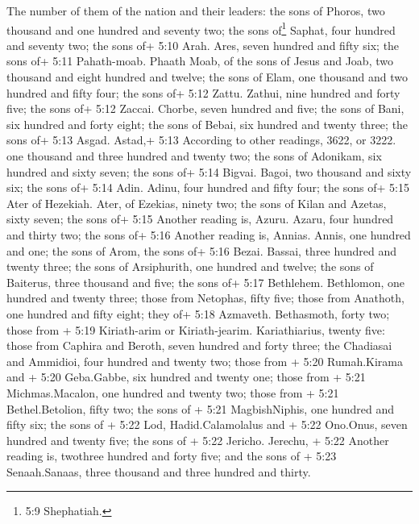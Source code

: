  The number of them of the nation and their leaders: the
sons of Phoros, two thousand and one hundred and seventy two; the sons
of\footnote{5:9 Shephatiah.} Saphat, four hundred and seventy two;
 the sons of+ 5:10 Arah. Ares, seven hundred and fifty six;
 the sons of+ 5:11 Pahath-moab. Phaath Moab, of the sons of
Jesus and Joab, two thousand and eight hundred and twelve; 
the sons of Elam, one thousand and two hundred and fifty four; the sons
of+ 5:12 Zattu. Zathui, nine hundred and forty five; the sons of+ 5:12
Zaccai. Chorbe, seven hundred and five; the sons of Bani, six hundred
and forty eight;  the sons of Bebai, six hundred and twenty
three; the sons of+ 5:13 Asgad. Astad,+ 5:13 According to other
readings, 3622, or 3222. one thousand and three hundred and twenty two;
 the sons of Adonikam, six hundred and sixty seven; the
sons of+ 5:14 Bigvai. Bagoi, two thousand and sixty six; the sons of+
5:14 Adin. Adinu, four hundred and fifty four;  the sons
of+ 5:15 Ater of Hezekiah. Ater, of Ezekias, ninety two; the sons of
Kilan and Azetas, sixty seven; the sons of+ 5:15 Another reading is,
Azuru. Azaru, four hundred and thirty two;  the sons of+
5:16 Another reading is, Annias. Annis, one hundred and one; the sons of
Arom, the sons of+ 5:16 Bezai. Bassai, three hundred and twenty three;
the sons of Arsiphurith, one hundred and twelve;  the sons
of Baiterus, three thousand and five; the sons of+ 5:17 Bethlehem.
Bethlomon, one hundred and twenty three;  those from
Netophas, fifty five; those from Anathoth, one hundred and fifty eight;
they of+ 5:18 Azmaveth. Bethasmoth, forty two;  those from
+ 5:19 Kiriath-arim or Kiriath-jearim. Kariathiarius, twenty five: those
from Caphira and Beroth, seven hundred and forty three; 
the Chadiasai and Ammidioi, four hundred and twenty two; those from +
5:20 Rumah.Kirama and + 5:20 Geba.Gabbe, six hundred and twenty one;
 those from + 5:21 Michmas.Macalon, one hundred and twenty
two; those from + 5:21 Bethel.Betolion, fifty two; the sons of + 5:21
MagbishNiphis, one hundred and fifty six;  the sons of +
5:22 Lod, Hadid.Calamolalus and + 5:22 Ono.Onus, seven hundred and
twenty five; the sons of + 5:22 Jericho. Jerechu, + 5:22 Another reading
is, twothree hundred and forty five;  and the sons of +
5:23 Senaah.Sanaas, three thousand and three hundred and thirty.

